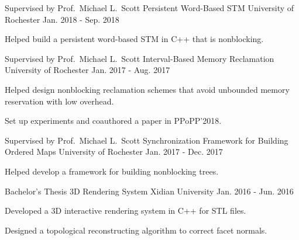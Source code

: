 \begin{cventries}
  \cventry
    {Supervised by Prof.\ Michael L.\ Scott} %
    {Persistent Word-Based STM} %
    {University of Rochester} %
    {Jan. 2018 - Sep. 2018} %
    {
      \begin{cvitems} %
        \item {Helped build a persistent word-based STM in C++ that is nonblocking.}
      \end{cvitems}
    }

  \cventry
    {Supervised by Prof.\ Michael L.\ Scott} %
    {Interval-Based Memory Reclamation} %
    {University of Rochester} %
    {Jan. 2017 - Aug. 2017} %
    {
      \begin{cvitems} %
        \item {Helped design nonblocking reclamation schemes that avoid unbounded memory reservation with low overhead.}
        \item {Set up experiments and coauthored a paper in PPoPP'2018.}
      \end{cvitems}
    }

  \cventry
    {Supervised by Prof.\ Michael L.\ Scott} %
    {Synchronization Framework for Building Ordered Maps} %
    {University of Rochester} %
    {Jan. 2017 - Dec. 2017} %
    {
      \begin{cvitems} %
        \item {Helped develop a framework for building nonblocking trees.}
      \end{cvitems}
    }

  \cventry
    {Bachelor's Thesis} %
    {3D Rendering System} %
    {Xidian University} %
    {Jan. 2016 - Jun. 2016} %
    {
      \begin{cvitems} %
        \item {Developed a 3D interactive rendering system in C++ for STL files.}
        \item {Designed a topological reconstructing algorithm to correct facet normals.}
      \end{cvitems}
    }
\end{cventries}
